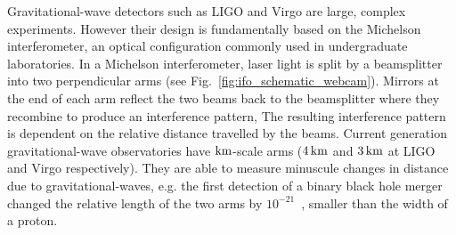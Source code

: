 \documentclass[paper-main.tex]{subfiles}
\begin{document}
Gravitational-wave detectors such as LIGO and Virgo are large, complex experiments. 
However their design is fundamentally based on the Michelson interferometer, an optical configuration commonly used in undergraduate laboratories. 
In a Michelson interferometer, laser light is split by a beamsplitter into two perpendicular arms (see Fig.~\ref{fig:ifo_schematic_webcam}). 
Mirrors at the end of each arm reflect the two beams back to the beamsplitter where they recombine to produce an interference pattern, 
The resulting interference pattern is dependent on the relative distance travelled by the beams. 
Current generation gravitational-wave observatories have ${\rm km}$-scale arms ($4\,{\rm km}$ and $3\,{\rm km}$ at LIGO and Virgo respectively). 
They are able to measure minuscule changes in distance due to gravitational-waves, e.g. the first detection of a binary black hole merger changed the relative length of the two arms by $10^{-21}$~\cite{GW150914}, smaller than the width of a proton.

\end{document}

